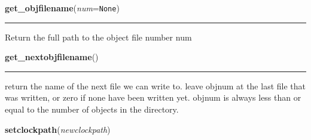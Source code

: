     \label{xdir:get_objfilename}

    \vspace{0.5ex}

    \begin{boxedminipage}{\textwidth}

    \raggedright \textbf{get\_objfilename}(\textit{num}=\texttt{None})

    \vspace{-1.5ex}

    \rule{\textwidth}{0.5\fboxrule}
    Return the full path to the object file number num

    \vspace{1ex}

    \end{boxedminipage}

    \label{xdir:get_nextobjfilename}

    \vspace{0.5ex}

    \begin{boxedminipage}{\textwidth}

    \raggedright \textbf{get\_nextobjfilename}()

    \vspace{-1.5ex}

    \rule{\textwidth}{0.5\fboxrule}
    return the name of the next file we can write to. leave objnum at the 
    last file that was written, or zero if none have been written yet. 
    objnum is always less than or equal to the number of objects in the 
    directory.

    \vspace{1ex}

    \end{boxedminipage}

    \label{xdir:setclockpath}

    \vspace{0.5ex}

    \begin{boxedminipage}{\textwidth}

    \raggedright \textbf{setclockpath}(\textit{newclockpath})

    \end{boxedminipage}

    \label{xdir:setdatapath}

